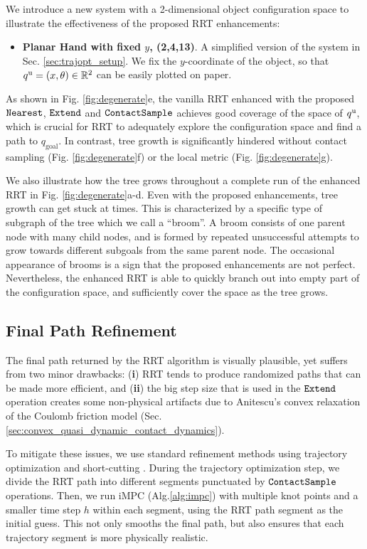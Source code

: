 We introduce a new system with a 2-dimensional object configuration space to illustrate the effectiveness of the proposed RRT enhancements:
\begin{itemize}
\item {\bf Planar Hand with fixed $y$, (2,4,13)}. A simplified version of the  system in Sec. \ref{sec:trajopt_setup}. We fix the $y$-coordinate of the object, so that $\qu = (x, \theta)\in \R[2]$ can be easily plotted on paper. 
\end{itemize}

As shown in Fig. \ref{fig:degenerate}e, the vanilla RRT enhanced with the proposed $\Nearest$, $\Extend$ and $\ContactSample$ achieves good coverage of the space of $\qu$, which is crucial for RRT to adequately explore the configuration space and find a path to $q_\mathrm{goal}$. In contrast, tree growth is significantly hindered without contact sampling (Fig. \ref{fig:degenerate}f) or the local metric (Fig. \ref{fig:degenerate}g).

We also illustrate how the tree grows throughout a complete run of the enhanced RRT in Fig. \ref{fig:degenerate}a-d. Even with the proposed enhancements, tree growth can get stuck at times. This is characterized by a specific type of subgraph of the tree which we call a ``broom''. A broom consists of one parent node with many child nodes, and is formed by repeated unsuccessful attempts to grow towards different subgoals from the same parent node. The occasional appearance of brooms is a sign that the proposed enhancements are not perfect. Nevertheless, the enhanced RRT is able to quickly branch out into empty part of the configuration space, and sufficiently cover the space as the tree grows. 

\subsection{Final Path Refinement}

The final path returned by the RRT algorithm is visually plausible, yet suffers from two minor drawbacks: (\textbf{i}) RRT tends to produce randomized paths that can be made more efficient, and (\textbf{ii}) the big step size that is used in the $\Extend$ operation creates some non-physical artifacts due to Anitescu’s convex relaxation of the Coulomb friction model (Sec.\ref{sec:convex_quasi_dynamic_contact_dynamics}). 

To mitigate these issues, we use standard refinement methods using trajectory optimization \cite{lgp,terry} and short-cutting \cite{shortcutting}. During the trajectory optimization step, we divide the RRT path into different segments punctuated by $\ContactSample$ operations. Then, we run iMPC (Alg.\ref{alg:impc}) with multiple knot points and a smaller time step $h$ within each segment, using the RRT path segment as the initial guess. This not only smooths the final path, but also ensures that each trajectory segment is more physically realistic. 

